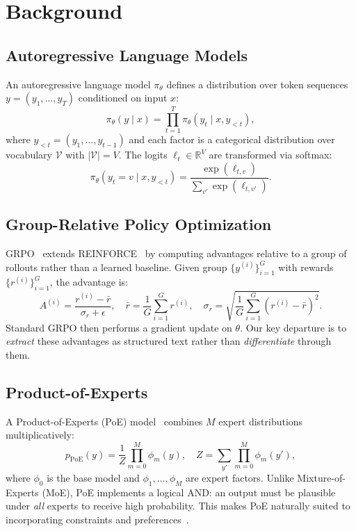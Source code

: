 \section{Background}

\label{sec:background}

\subsection{Autoregressive Language Models}

An autoregressive language model $\pi_\theta$ defines a distribution over token
sequences $y = (y_1, \ldots, y_T)$ conditioned on input $x$:
\begin{equation}
    \pi_\theta(y \mid x) = \prod_{t=1}^{T} \pi_\theta(y_t \mid x, y_{<t}),
\end{equation}
where $y_{<t} = (y_1, \ldots, y_{t-1})$ and each factor is a categorical
distribution over vocabulary $\mathcal{V}$ with $|\mathcal{V}| = V$. The logits
$\ell_t \in \mathbb{R}^V$ are transformed via softmax:
\begin{equation}
    \pi_\theta(y_t = v \mid x, y_{<t}) = \frac{\exp(\ell_{t,v})}{\sum_{v'} \exp(\ell_{t,v'})}.
\end{equation}

\subsection{Group-Relative Policy Optimization}

GRPO~\cite{shao2024deepseekmath} extends REINFORCE~\cite{williams1992simple}
by computing advantages relative to a group of rollouts rather than a learned
baseline. Given group $\{y^{(i)}\}_{i=1}^G$ with rewards $\{r^{(i)}\}_{i=1}^G$,
the advantage is:
\begin{equation}
    A^{(i)} = \frac{r^{(i)} - \bar{r}}{\sigma_r + \epsilon},
    \quad \bar{r} = \frac{1}{G}\sum_{i=1}^G r^{(i)},
    \quad \sigma_r = \sqrt{\frac{1}{G}\sum_{i=1}^G (r^{(i)} - \bar{r})^2}.
\end{equation}
Standard GRPO then performs a gradient update on $\theta$. Our key departure is
to \emph{extract} these advantages as structured text rather than
\emph{differentiate} through them.

\subsection{Product-of-Experts}

A Product-of-Experts (PoE) model~\cite{hinton2002training} combines $M$ expert
distributions multiplicatively:
\begin{equation}
    p_{\text{PoE}}(y) = \frac{1}{Z} \prod_{m=0}^{M} \phi_m(y),
    \quad Z = \sum_{y'} \prod_{m=0}^{M} \phi_m(y'),
\end{equation}
where $\phi_0$ is the base model and $\phi_1, \ldots, \phi_M$ are expert
factors. Unlike Mixture-of-Experts (MoE), PoE implements a logical AND: an
output must be plausible under \emph{all} experts to receive high probability.
This makes PoE naturally suited to incorporating constraints and
preferences~\cite{du2023reducing}.

